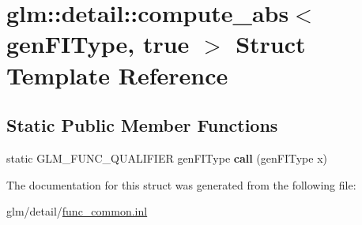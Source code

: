 \hypertarget{structglm_1_1detail_1_1compute__abs_3_01genFIType_00_01true_01_4}{\section{glm\-:\-:detail\-:\-:compute\-\_\-abs$<$ gen\-F\-I\-Type, true $>$ Struct Template Reference}
\label{structglm_1_1detail_1_1compute__abs_3_01genFIType_00_01true_01_4}
}
\subsection*{Static Public Member Functions}
\begin{DoxyCompactItemize}
\item 
\hypertarget{structglm_1_1detail_1_1compute__abs_3_01genFIType_00_01true_01_4_aa71d12c5d1f14e48f3be96bdf6b95861}{static G\-L\-M\-\_\-\-F\-U\-N\-C\-\_\-\-Q\-U\-A\-L\-I\-F\-I\-E\-R gen\-F\-I\-Type {\bfseries call} (gen\-F\-I\-Type x)}\label{structglm_1_1detail_1_1compute__abs_3_01genFIType_00_01true_01_4_aa71d12c5d1f14e48f3be96bdf6b95861}

\end{DoxyCompactItemize}


The documentation for this struct was generated from the following file\-:\begin{DoxyCompactItemize}
\item 
glm/detail/\hyperlink{func__common_8inl}{func\-\_\-common.\-inl}\end{DoxyCompactItemize}
